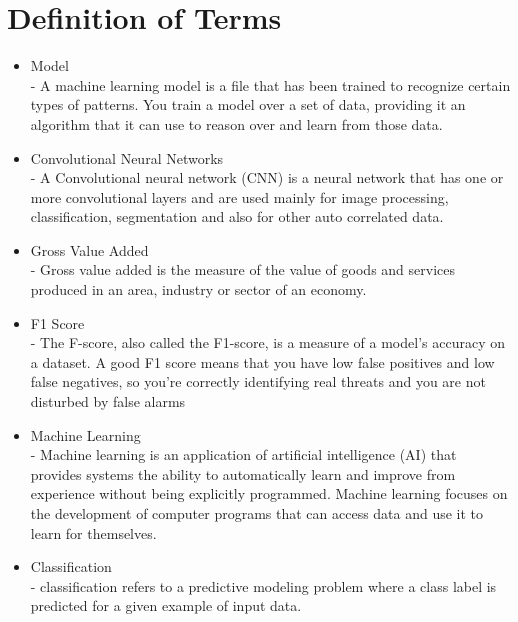\section{Definition of Terms}
    \begin{itemize}
        \item Model \\
              - A machine learning model is a file that has
              been trained to recognize certain types of patterns.
              You train a model over a set of data, providing it an
              algorithm that it can use to reason over and learn 
              from those data.

        \item Convolutional Neural Networks \\
              - A Convolutional neural network (CNN) is a neural network 
              that has one or more convolutional layers and are used mainly
              for image processing, classification, segmentation and also 
              for other auto correlated data.

        \item Gross Value Added \\
              - Gross value added is the measure of the value of 
              goods and services produced in an area, industry or sector 
              of an economy.

        \item F1 Score \\
              - The F-score, also called the F1-score, is a measure of a model's accuracy 
              on a dataset. A good F1 score means that you have low false positives and 
              low false negatives, so you're correctly identifying real threats and you are not disturbed by false alarms
              
        \item Machine Learning \\
              - Machine learning is an application of artificial intelligence 
              (AI) that provides systems the ability to automatically learn and
              improve from experience without being explicitly programmed. 
              Machine learning focuses on the development of computer programs 
              that can access data and use it to learn for themselves.

        \item Classification \\
              - classification refers to a predictive modeling problem where a
              class label is predicted for a given example of input data. 
    \end{itemize}


